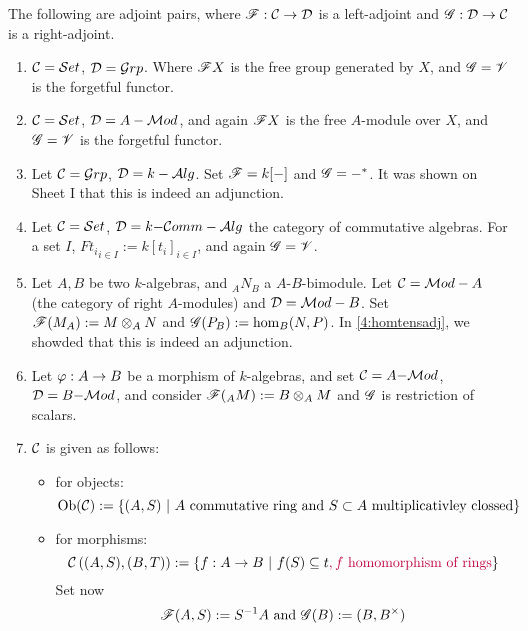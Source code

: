 \begin{bsp}
    The following are adjoint pairs, where $\mathscr{F}:\mathcal{C} \to \mathcal{D}$ is a left-adjoint and $\mathscr{G}:\mathcal{D} \to \mathcal{C}$ is a right-adjoint.
    \begin{enumerate} 
        \item $\mathcal{C} = \mathcal{S}et$, $\mathcal{D} = \mathcal{G}rp$. Where $\mathscr{F} X$ is the free group generated by $X$, and $\mathscr{G} = \mathscr{V}$ is the forgetful functor. 
        \item $\mathcal{C} = \mathcal{S}et$, $\mathcal{D} = A-\mathcal{M}od$, and again $\mathscr{F} X$ is the free $A$-module over $X$, and $\mathscr{G} = \mathscr{V}$ is the forgetful functor.
        \item Let $\mathcal{C} = \mathcal{G}rp$, $\mathcal{D} = k-\mathcal{A}lg$. Set $\mathscr{F} = k[\mathrm{-}]$ and $\mathscr{G} = \mathrm{-}^{\ast}$. It was shown on Sheet I that this is indeed an adjunction.
        \item Let $\mathcal{C} = \mathcal{S}et$, $\mathcal{D} = k\mathrm{-}\mathcal{C}omm-\mathcal{A}lg$ the category of commutative algebras. \coms For a set $I$\come, $F{t_i}_{i\in I}:= k[t_i]_{i\in I}$, and again $\mathscr{G} = \mathscr{V}$. 
        \item Let $A,B$ be two $k$-algebras, and ${}_AN_B$ a $A$-$B$-bimodule. Let $\mathcal{C}=\mathcal{M}od-A$ (the category of right $A$-modules) and $\mathcal{D} = \mathcal{M}od-B$. Set $\mathscr{F}(M_A):= M\otimes_AN$ and $\mathscr{G}(P_B):= \hom_{B}(N,P)$. In \cref{4:homtensadj}, we showded that this is indeed an adjunction.
        \item Let $\varphi:A\to B$ be a morphism of $k$-algebras, and set $\mathcal{C} = A\mathrm{-}\mathcal{M}od$, $\mathcal{D} = B\mathrm{-} \mathcal{M}od$, and consider $\mathscr{F}({}_AM) := B\otimes_AM$ and $\mathscr{G}$ is restriction of scalars.
        \item $\mathcal{C}$ is given as follows:
        \begin{itemize}
            \item for objects:
            \[
            \text{Ob}(\mathcal{C}) := \{ (A,S)~|~ A\text{ commutative ring and }S\subset A\text{ multiplicativley clossed} \}
            \]
            \item for morphisms: 
            \[
            \mathcal{C}\left((A,S),(B,T)\right) := \{f:A\to B~|~ f(S)\subseteq t\color{purple},f\text{ homomorphism of rings}\color{black}\}
            \] Set now 
            \[
            \mathscr{F}(A,S):= S^{-1}A\text{ and }\mathscr{G}(B):= (B,B^{\times})
            \]
        \end{itemize}
    \end{enumerate}
\end{bsp}

